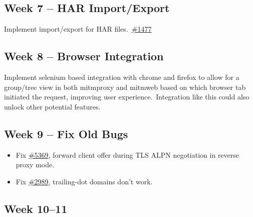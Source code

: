 \subsection{Week 7 -- HAR Import/Export}
\label{subsec:week-7}

Implement import/export for HAR files.\ \href{https://github.com/mitmproxy/mitmproxy/issues/1477}{\#1477}


\subsection{Week 8 -- Browser Integration}
\label{subsec:week-8}

Implement selenium based integration with chrome and firefox to allow for a group/tree view in both mitmproxy and
mitmweb based on which browser tab initiated the request, improving user experience.\ Integration like this could
also unlock other potential features.


\subsection{Week 9 -- Fix Old Bugs}
\label{subsec:week-9}

\begin{itemize}

    \item Fix \href{https://github.com/mitmproxy/mitmproxy/issues/5369}{\#5369}, forward client offer during TLS
    ALPN negotiation in reverse proxy mode.\

    \item Fix \href{https://github.com/mitmproxy/mitmproxy/issues/2989}{\#2989}, trailing-dot domains don't work.

\end{itemize}


\subsection{Week 10--11}
\label{subsec:week-10-11}

